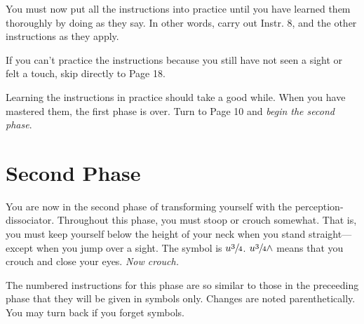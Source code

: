 \vfill
You must now put all the instructions into practice until you have 
learned them thoroughly by doing as they say. In other words, carry out 
Instr. 8, and the other instructions as they apply. 

\vfill
If you can't practice the instructions because you still have not seen a 
sight or felt a touch, skip directly to Page 18. 

\vfill

Learning the instructions in practice should take a good while. When 
you have mastered them, the first phase is over. Turn to Page 10 and \textit{begin the second phase}.

\vfill

\clearpage


\section{Second Phase}

\vfill
You are now in the second phase of transforming yourself with the 
perception-dissociator. Throughout this phase, you must stoop or crouch 
somewhat. That is, you must keep yourself below the height of your neck 
when you stand straight---except when you jump over a sight. The symbol is 
$u\sfrac{3}{4}$. $u\sfrac{3}{4}\wedge$ means that you crouch and close your eyes. \emph{Now crouch.}

The numbered instructions for this phase are so similar to those in the 
preceeding phase that they will be given in symbols only. Changes are noted 
parenthetically. You may turn back if you forget symbols. 

